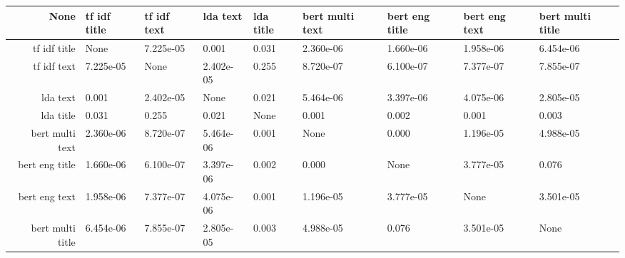 \begin{tabular}{|r|l|l|l|l|l|l|l|l|}
  \hline
  None & tf idf title & tf idf text & lda text & lda title & bert multi text & bert eng title & bert eng text & bert multi title \\ 
  \hline
  tf idf title & None & 7.225e-05 & 0.001 & 0.031 & 2.360e-06 & 1.660e-06 & 1.958e-06 & 6.454e-06 \\ 
  \hline
  tf idf text & 7.225e-05 & None & 2.402e-05 & 0.255 & 8.720e-07 & 6.100e-07 & 7.377e-07 & 7.855e-07 \\ 
  \hline
  lda text & 0.001 & 2.402e-05 & None & 0.021 & 5.464e-06 & 3.397e-06 & 4.075e-06 & 2.805e-05 \\ 
  \hline
  lda title & 0.031 & 0.255 & 0.021 & None & 0.001 & 0.002 & 0.001 & 0.003 \\ 
  \hline
  bert multi text & 2.360e-06 & 8.720e-07 & 5.464e-06 & 0.001 & None & 0.000 & 1.196e-05 & 4.988e-05 \\ 
  \hline
  bert eng title & 1.660e-06 & 6.100e-07 & 3.397e-06 & 0.002 & 0.000 & None & 3.777e-05 & 0.076 \\ 
  \hline
  bert eng text & 1.958e-06 & 7.377e-07 & 4.075e-06 & 0.001 & 1.196e-05 & 3.777e-05 & None & 3.501e-05 \\ 
  \hline
  bert multi title & 6.454e-06 & 7.855e-07 & 2.805e-05 & 0.003 & 4.988e-05 & 0.076 & 3.501e-05 & None \\ 
  \hline
\end{tabular}
